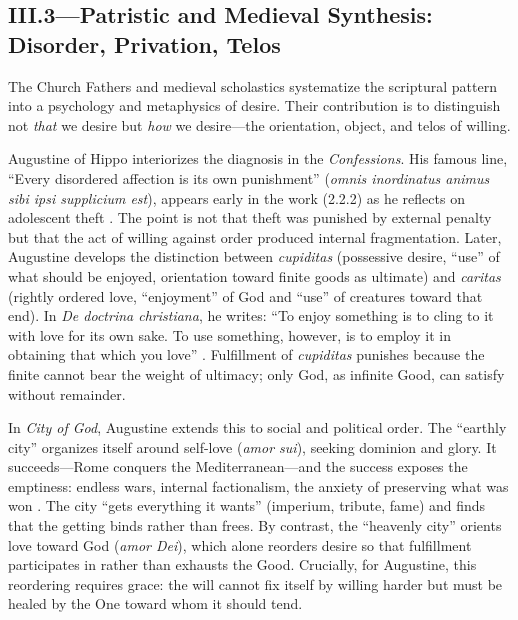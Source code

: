 \subsection*{III.3—Patristic and Medieval Synthesis: Disorder, Privation, Telos}
\label{ssec:iii-patristic-medieval}

The Church Fathers and medieval scholastics systematize the scriptural pattern into a
psychology and metaphysics of desire. Their contribution is to distinguish not \emph{that} we
desire but \emph{how} we desire---the orientation, object, and telos of willing.

Augustine of Hippo interiorizes the diagnosis in the \emph{Confessions}. His famous line,
``Every disordered affection is its own punishment'' (\emph{omnis inordinatus animus sibi ipsi
	supplicium est}), appears early in the work (2.2.2) as he reflects on adolescent theft
. The point is not that theft was punished by
external penalty but that the act of willing against order produced internal fragmentation.
Later, Augustine develops the distinction between \emph{cupiditas} (possessive desire, ``use''
of what should be enjoyed, orientation toward finite goods as ultimate) and \emph{caritas}
(rightly ordered love, ``enjoyment'' of God and ``use'' of creatures toward that end). In
\emph{De doctrina christiana}, he writes: ``To enjoy something is to cling to it with love for
its own sake. To use something, however, is to employ it in obtaining that which you love''
\parencite{AugustineDeDoctrina1958}. Fulfillment of \emph{cupiditas} punishes because the
finite cannot bear the weight of ultimacy; only God, as infinite Good, can satisfy without
remainder.

In \emph{City of God}, Augustine extends this to social and political order. The ``earthly
city'' organizes itself around self-love (\emph{amor sui}), seeking dominion and glory. It
succeeds---Rome conquers the Mediterranean---and the success exposes the emptiness: endless
wars, internal factionalism, the anxiety of preserving what was won
. The city ``gets everything it wants'' (imperium, tribute,
fame) and finds that the getting binds rather than frees. By contrast, the ``heavenly city''
orients love toward God (\emph{amor Dei}), which alone reorders desire so that fulfillment
participates in rather than exhausts the Good. Crucially, for Augustine, this reordering
requires grace: the will cannot fix itself by willing harder but must be healed by the One
toward whom it should tend.

